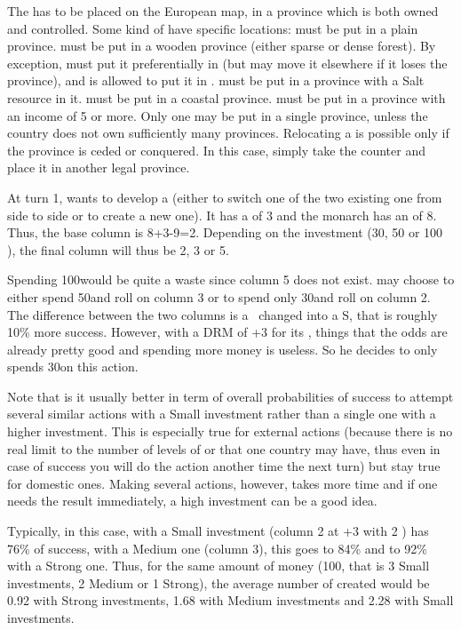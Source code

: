 \label{chExpenses:Manufacture Placement} The \MNU
has to be placed on the European map, in a province which is both owned and
controlled. Some kind of \MNU have specific locations:
\bparag {} \MNU must be put in a plain province.
\bparag {} \MNU must be put in a wooden province (either sparse or
dense forest). By exception, \ENG must put it preferentially in
 (but may move it elsewhere if it loses the province), and
\TUR is allowed to put it in .
\bparag {} \MNU must be put in a province with a Salt resource in it.
\bparag {} \MNU must be put in a coastal province.
\bparag {} \MNU must be put in a province with an income of 5 or more.
\bparag Only one \MNU may be put in a single province, unless the country does
not own sufficiently many provinces.
\bparag Relocating a \MNU is possible only if the province is ceded or
conquered. In this case, simply take the counter and place it in another legal
province.

\begin{exemple}
  At turn 1, \POR wants to develop a \MNU (either to switch one of the two
  existing one from side \Facemoins to side \Faceplus or to create a new
  one). It has a \DTI of 3 and the monarch has an \ADM of 8. Thus, the base
  column is 8+3-9=2. Depending on the investment (30, 50 or 100 \ducats), the
  final column will thus be 2, 3 or 5.

  Spending 100\ducats would be quite a waste since column 5 does not
  exist. \POR may choose to either spend 50\ducats and roll on column 3 or to
  spend only 30\ducats and roll on column 2. The difference between the two
  columns is a \undemi\ changed into a S, that is roughly 10\% more
  success. However, with a DRM of +3 for its \STAB, \POR things that the odds
  are already pretty good and spending more money is useless. So he decides to
  only spends 30\ducats on this action.
\end{exemple}

\begin{designnote}
  Note that is it usually better in term of overall probabilities of success
  to attempt several similar actions with a Small investment rather than a
  single one with a higher investment. This is especially true for external
  actions (because there is no real limit to the number of levels of
  \TradeFLEET or \COL that one country may have, thus even in case of success
  you will do the action another time the next turn) but stay true for
  domestic ones. Making several actions, however, takes more time and if one
  needs the result immediately, a high investment can be a good idea.

  Typically, in this case, with a Small investment (column 2 at +3 with 2
  \FTI) \POR has 76\% of success, with a Medium one (column 3), this goes to
  84\% and to 92\% with a Strong one. Thus, for the same amount of money
  (100\ducats, that is 3 Small investments, 2 Medium or 1 Strong), the average
  number of \MNU created would be 0.92 with Strong investments, 1.68 with
  Medium investments and 2.28 with Small investments.
\end{designnote}


